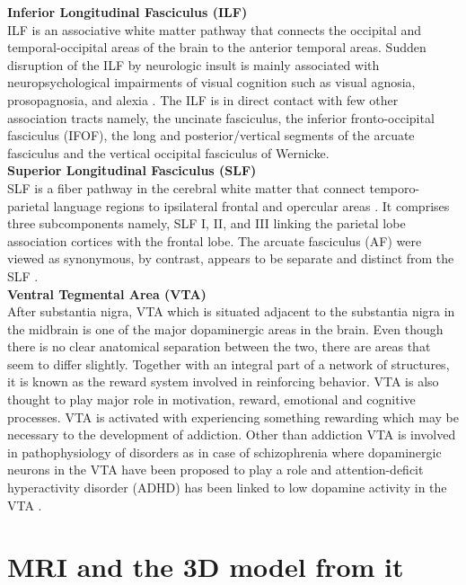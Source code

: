 \documentclass[../structure.tex]{subfiles}
\begin{document}
				
		\textbf{Inferior Longitudinal Fasciculus (ILF)}\\		
		ILF is an associative white matter pathway that connects the occipital and temporal-occipital areas of the brain to the anterior temporal areas.  Sudden disruption of the ILF by neurologic insult is mainly associated with  neuropsychological impairments of visual cognition such as visual agnosia, prosopagnosia, and alexia \cite{Herbet2018}. The ILF is in direct contact with few other association tracts namely, the uncinate fasciculus, the inferior fronto-occipital fasciculus (IFOF), the long and posterior/vertical segments of the arcuate fasciculus and the vertical occipital fasciculus of Wernicke.\\

		

		\textbf{Superior Longitudinal Fasciculus (SLF)}\\			
		SLF is a fiber pathway in the cerebral white matter that connect temporo-parietal language regions to ipsilateral frontal and opercular areas \cite{Madhavan2014}. It comprises three subcomponents namely, SLF I, II, and III linking the parietal lobe association cortices with the frontal lobe. The arcuate fasciculus (AF) were viewed as synonymous, by contrast, appears to be separate and distinct from the SLF \cite{Schmahmann2006}.\\
		
		
		\textbf{Ventral Tegmental Area (VTA)}\\
		After substantia nigra, VTA which is situated adjacent to the substantia nigra in the midbrain is one of the major dopaminergic areas in the brain. Even though there is no clear anatomical separation between the two, there are areas that seem to differ slightly. Together with an integral part of a network of structures, it is known as the reward system involved in reinforcing behavior. VTA is also thought to play major role in motivation, reward, emotional and cognitive processes. VTA is activated with experiencing something rewarding which may be necessary to the development of addiction. Other than addiction VTA is involved in pathophysiology of disorders as in case of schizophrenia where dopaminergic neurons in the VTA have been proposed to play a role and attention-deficit hyperactivity disorder (ADHD) has been linked to low dopamine activity in the VTA \cite{Kalivas1993}.
	
\section{MRI and the 3D model from it}
\end{document}

